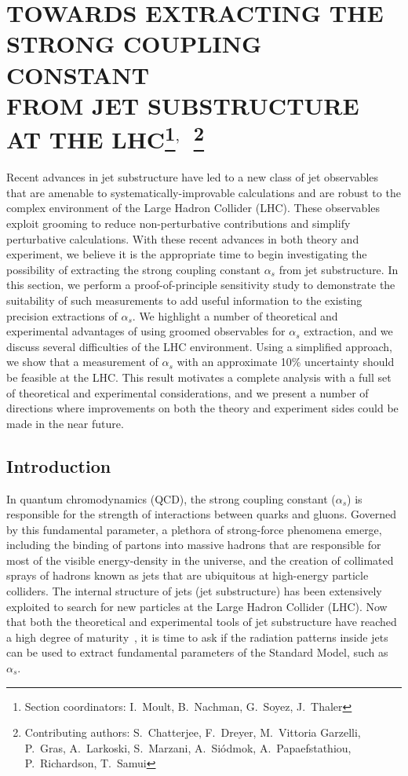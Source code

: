 \documentclass[11pt]{cernrep}
\begin{document}
\section{TOWARDS EXTRACTING THE STRONG COUPLING CONSTANT \\ FROM JET SUBSTRUCTURE AT THE LHC\protect\footnote{Section coordinators:  I.~Moult, B.~Nachman, G.~Soyez, J.~Thaler}$^{,}$~\protect\footnote{Contributing authors: S.~Chatterjee, F.~Dreyer, M.~Vittoria Garzelli, P.~Gras, A.~Larkoski, S.~Marzani, A.~Si\'{o}dmok, A.~Papaefstathiou, P.~Richardson, T.~Samui}}

Recent advances in jet substructure have led to a new class of jet observables that are amenable to systematically-improvable calculations and are robust to the complex environment of the Large Hadron Collider (LHC).
%
These observables exploit grooming to reduce non-perturbative contributions and simplify perturbative calculations.
%
With these recent advances in both theory and experiment, we believe it is the appropriate time to begin investigating the possibility of extracting the strong coupling constant $\alpha_s$ from jet substructure.
%
In this section, we perform a proof-of-principle sensitivity study to demonstrate the suitability of such measurements to add useful information to the existing precision extractions of $\alpha_s$.
%
We highlight a number of theoretical and experimental advantages of using groomed observables for $\alpha_s$ extraction, and we discuss several difficulties of the LHC environment.
%
Using a simplified approach, we show that a measurement of $\alpha_s$ with an approximate 10\% uncertainty should be feasible at the LHC.
%
This result motivates a complete analysis with a full set of theoretical and experimental considerations, and we present a number of directions where improvements on both the theory and experiment sides could be made in the near future.

\subsection{Introduction}

In quantum chromodynamics (QCD), the strong coupling constant ($\alpha_s$) is responsible for the strength of interactions between quarks and gluons.
%
Governed by this fundamental parameter, a plethora of strong-force phenomena emerge, including the binding of partons into massive hadrons that are responsible for most of the visible energy-density in the universe, and the creation of collimated sprays of hadrons known as jets that are ubiquitous at high-energy particle colliders.
%
The internal structure of jets (jet substructure) has been extensively exploited to search for new particles at the Large Hadron Collider (LHC).
%
Now that both the theoretical and experimental tools of jet substructure have reached a high degree of maturity~\cite{Abdesselam:2010pt,Altheimer:2012mn,Altheimer:2013yza,Adams:2015hiv,Larkoski:2017jix}, it is time to ask if the radiation patterns inside jets can be used to extract fundamental parameters of the Standard Model, such as $\alpha_s$.
\end{document}
